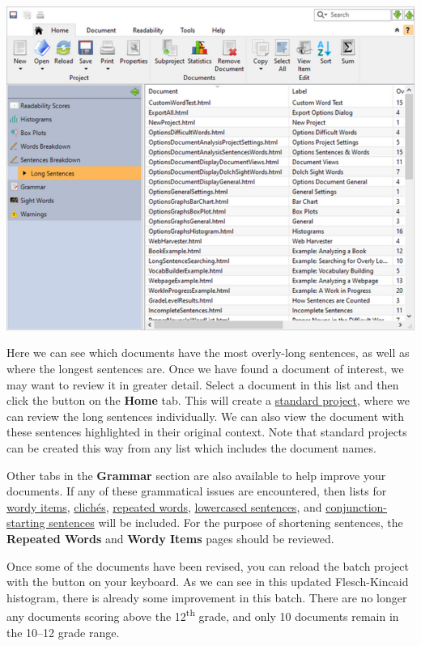 \documentclass[
]{book}
\theoremstyle{definition}
\theoremstyle{definition}
\theoremstyle{definition}
\theoremstyle{definition}
\theoremstyle{remark}
\begin{document}
\includegraphics{Images/batchlongsentences.png}

Here we can see which documents have the most overly-long sentences, as well as where the longest sentences are. Once we have found a document of interest, we may want to review it in greater detail. Select a document in this list and then click the  button on the \textbf{Home} tab. This will create a \protect\hyperlink{creating-standard-project}{standard project}, where we can review the long sentences individually. We can also view the document with these sentences highlighted in their original context. Note that standard projects can be created this way from any list which includes the document names.

Other tabs in the \textbf{Grammar} section are also available to help improve your documents. If any of these grammatical issues are encountered, then lists for \protect\hyperlink{reviewing-batch-wordiness}{wordy items}, \protect\hyperlink{reviewing-batch-cliches}{clichés}, \protect\hyperlink{reviewing-batch-repeated-words}{repeated words}, \protect\hyperlink{reviewing-batch-lowercased-sentences}{lowercased sentences}, and \protect\hyperlink{reviewing-batch-conjunction-sentences}{conjunction-starting sentences} will be included. For the purpose of shortening sentences, the \textbf{Repeated Words} and \textbf{Wordy Items} pages should be reviewed.

Once some of the documents have been revised, you can reload the batch project with the  button on your keyboard. As we can see in this updated Flesch-Kincaid histogram, there is already some improvement in this batch. There are no longer any documents scoring above the 12\textsuperscript{th} grade, and only 10 documents remain in the 10--12 grade range.
\end{document}
